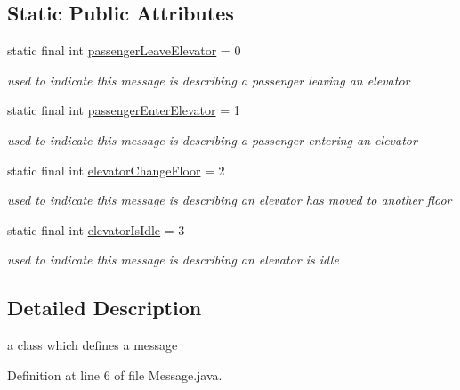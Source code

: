 \subsection*{Static Public Attributes}
\begin{DoxyCompactItemize}
\item 
static final int \hyperlink{classcn_1_1leonwong_1_1_elevator_simulator_1_1_model_1_1_message_a8ff9f9824b15bd10efe3770f39a136dc}{passenger\+Leave\+Elevator} = 0
\begin{DoxyCompactList}\small\item\em used to indicate this message is describing a passenger leaving an elevator \end{DoxyCompactList}\item 
static final int \hyperlink{classcn_1_1leonwong_1_1_elevator_simulator_1_1_model_1_1_message_a3e7e9d33eaa7f246158d4b2151945379}{passenger\+Enter\+Elevator} = 1
\begin{DoxyCompactList}\small\item\em used to indicate this message is describing a passenger entering an elevator \end{DoxyCompactList}\item 
static final int \hyperlink{classcn_1_1leonwong_1_1_elevator_simulator_1_1_model_1_1_message_aa2a04ac8a674b25966e29d05099afc16}{elevator\+Change\+Floor} = 2
\begin{DoxyCompactList}\small\item\em used to indicate this message is describing an elevator has moved to another floor \end{DoxyCompactList}\item 
static final int \hyperlink{classcn_1_1leonwong_1_1_elevator_simulator_1_1_model_1_1_message_a182e2c484b12304f0a091ad7d11deb33}{elevator\+Is\+Idle} = 3
\begin{DoxyCompactList}\small\item\em used to indicate this message is describing an elevator is idle \end{DoxyCompactList}\end{DoxyCompactItemize}


\subsection{Detailed Description}
a class which defines a message 

Definition at line 6 of file Message.\+java.



